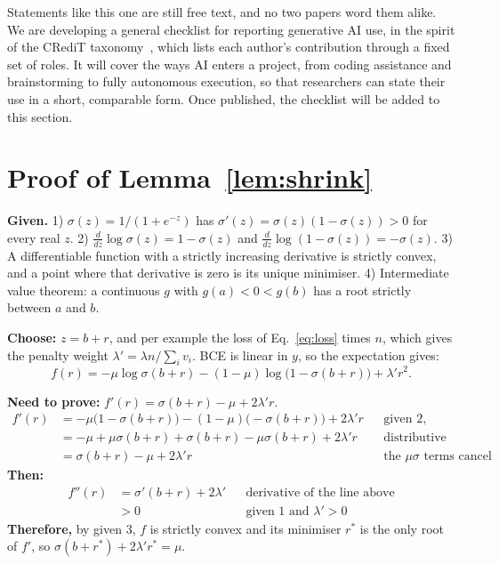 \documentclass{article}
\begin{document}
Statements like this one are still free text, and no two papers word them alike. We are developing a general
checklist for reporting generative AI use, in the spirit of the CRediT taxonomy~\citep{brand2015credit}, which lists
each author's contribution through a fixed set of roles. It will cover the ways AI enters a project, from coding
assistance and brainstorming to fully autonomous execution, so that researchers can state their use in a short,
comparable form. Once published, the checklist will be added to this section.




\appendix

\section{Proof of Lemma~\ref{lem:shrink}}
\label{app:proof}

\textbf{Given.}
1) $\sigma(z) = 1/(1 + e^{-z})$ has $\sigma'(z) = \sigma(z)(1 - \sigma(z)) > 0$ for every real $z$.
2) $\frac{d}{dz}\log\sigma(z) = 1 - \sigma(z)$ and $\frac{d}{dz}\log(1 - \sigma(z)) = -\sigma(z)$.
3) A differentiable function with a strictly increasing derivative is strictly convex, and a point where that
derivative is zero is its unique minimiser.
4) Intermediate value theorem: a continuous $g$ with $g(a) < 0 < g(b)$ has a root strictly between $a$ and $b$.

\textbf{Choose:} $z = b + r$, and per example the loss of Eq.~\eqref{eq:loss} times $n$, which gives the penalty
weight $\lambda' = \lambda n / \sum_i v_i$. BCE is linear in $y$, so the expectation gives:
\[
f(r) = -\mu \log\sigma(b + r) - (1 - \mu)\log\bigl(1 - \sigma(b + r)\bigr) + \lambda' r^2 .
\]

\textbf{Need to prove:} $f'(r) = \sigma(b + r) - \mu + 2\lambda' r$.
\begin{align*}
f'(r) &= -\mu\bigl(1 - \sigma(b+r)\bigr) - (1-\mu)\bigl(-\sigma(b+r)\bigr) + 2\lambda' r && \text{given 2, chain rule}\\
      &= -\mu + \mu\sigma(b+r) + \sigma(b+r) - \mu\sigma(b+r) + 2\lambda' r && \text{distributive law}\\
      &= \sigma(b+r) - \mu + 2\lambda' r && \text{the $\mu\sigma$ terms cancel}
\end{align*}
\textbf{Then:}
\begin{align*}
f''(r) &= \sigma'(b+r) + 2\lambda' && \text{derivative of the line above}\\
       &> 0 && \text{given 1 and } \lambda' > 0
\end{align*}
\textbf{Therefore,} by given 3, $f$ is strictly convex and its minimiser $r^{*}$ is the only root of $f'$, so
$\sigma(b + r^{*}) + 2\lambda' r^{*} = \mu$.
\end{document}
